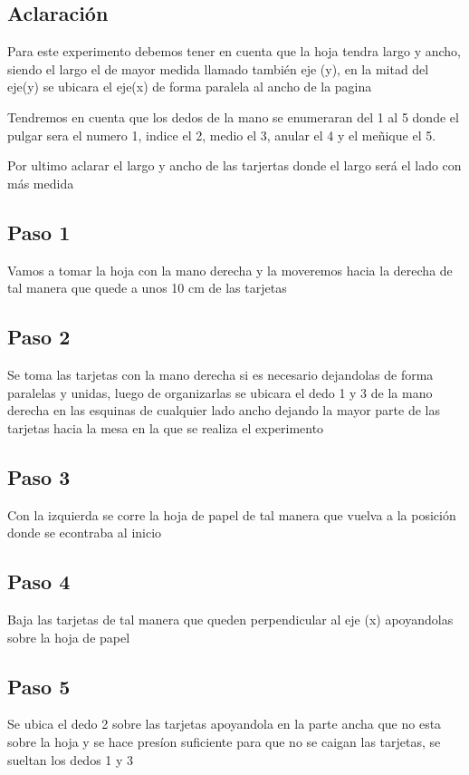 \documentclass{article}
\begin{document}
\subsection{Aclaración}
Para este experimento debemos tener en cuenta que la hoja tendra largo y ancho, siendo el largo el de mayor medida llamado también eje (y), en la mitad del eje(y) se ubicara el eje(x) de forma paralela al ancho de la pagina 

Tendremos en cuenta que los dedos de la mano se enumeraran del 1 al 5 donde el pulgar sera el numero 1, indice el 2, medio el 3, anular el 4 y el meñique el 5.

Por ultimo aclarar el largo y ancho de las tarjertas donde el largo será el lado con más medida

\subsection{Paso 1}
Vamos a tomar la hoja con la mano derecha y la moveremos hacia la derecha de tal manera que quede a unos 10 cm de las tarjetas

\subsection{Paso 2}
Se toma las tarjetas con la mano derecha si es necesario dejandolas  de forma paralelas y unidas, luego de organizarlas se ubicara el dedo 1 y 3 de la mano derecha en las esquinas de cualquier lado ancho dejando la mayor parte de las tarjetas hacia la mesa en la que se realiza el experimento

\subsection{Paso 3}
Con la izquierda se corre la hoja de papel de tal manera que vuelva a la posición donde se econtraba al inicio 

\subsection{Paso 4}
Baja las tarjetas de tal manera que queden perpendicular al eje (x) apoyandolas sobre la hoja de papel

\subsection{Paso 5}
Se ubica el dedo 2 sobre las tarjetas apoyandola en la parte ancha que no esta sobre la hoja y se hace presíon suficiente para que no se caigan las tarjetas, se sueltan los dedos 1 y 3
\end{document}
